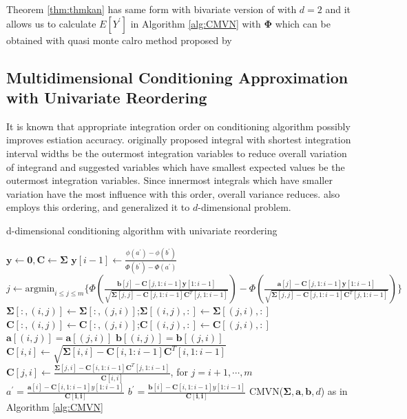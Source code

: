 Theorem \ref{thm:thmkan} has same form with bivariate version of \citet{trinh2015bivariate} with $d=2$ and it allows us to calculate $E[Y^\prime]$ in Algorithm \ref{alg:CMVN} with $\boldsymbol{\Phi}$ which can be obtained with quasi monte calro method proposed by \citet{genz2009computation}

\subsection{Multidimensional Conditioning Approximation with Univariate Reordering}
It is known that appropriate integration order on conditioning algorithm possibly improves estiation accuracy. \citet{schervish1984algorithm} originally proposed integral with shortest integration interval widths be the outermost integration variables to reduce overall variation of integrand and \citet{gibson1994monte} suggested variables which have smallest expected values be the outermost integration variables. Since innermost integrals which have smaller variation have the most influence with this order, overall variance reduces.
\citet{trinh2015bivariate} also employs this ordering, and \citet{cao2019hierarchical} generalized it to $d$-dimensional problem.
\begin{algorithm}[H]
	\caption{d-dimensional conditioning algorithm with univariate reordering}
	\begin{algorithmic}[1]
		\State $\mathbf{y}\leftarrow\mathbf{0},\mathbf{C}\leftarrow\mathbf{\Sigma}$
		\State $\mathbf{y}[i-1]\leftarrow\frac{\phi(a^\prime)-\phi(b^\prime)}{\Phi(b^\prime)-\Phi(a^\prime)}$
		\EndIf
		\State $j\leftarrow\text{argmin}_{i\leq j\leq m}\{\Phi(\frac{\mathbf{b}[j]-\mathbf{C}[j,1:i-1]\mathbf{y}[1:i-1]}{\sqrt{\mathbf{\Sigma}[j,j]-\mathbf{C}[j,1:i-1]\mathbf{C}^T[j,1:i-1]}})-\Phi(\frac{\mathbf{a}[j]-\mathbf{C}[j,1:i-1]\mathbf{y}[1:i-1]}{\sqrt{\mathbf{\Sigma}[j,j]-\mathbf{C}[j,1:i-1]\mathbf{C}^T[j,1:i-1]}})\}$
		\State $\mathbf{\Sigma}[:,(i,j)]\leftarrow\mathbf{\Sigma}[:,(j,i)]$;$\mathbf{\Sigma}[(i,j),:]\leftarrow\mathbf{\Sigma}[(j,i),:]$
		\State $\mathbf{C}[:,(i,j)]\leftarrow\mathbf{C}[:,(j,i)]$;$\mathbf{C}[(i,j),:]\leftarrow\mathbf{C}[(j,i),:]$
		\State $\mathbf{a}[(i,j)]=\mathbf{a}[(j,i)]$
		\State $\mathbf{b}[(i,j)]=\mathbf{b}[(j,i)]$
		\State $\mathbf{C}[i,i]\leftarrow\sqrt{\mathbf{\Sigma}[i,i]-\mathbf{C}[i,1:i-1]\mathbf{C}^T[i,1:i-1]}$
		\State $\mathbf{C}[j,i]\leftarrow \frac{\mathbf{\Sigma}[j,i]-\mathbf{C}[i,1:i-1]\mathbf{C}^T[j,1:i-1]}{\mathbf{C}[i,i]}$, for $j=i+1,\cdots,m$
		\State $a^\prime=\frac{\mathbf{a}[i]-\mathbf{C}[i,1:i-1]y[1:i-1]}{\mathbf{C[i,i]}}$
		\State $b^\prime=\frac{\mathbf{b}[i]-\mathbf{C}[i,1:i-1]y[1:i-1]}{\mathbf{C[i,i]}}$
		\EndFor
		\State\Return CMVN($\mathbf{\Sigma},\mathbf{a},\mathbf{b},d$) as in Algorithm \ref{alg:CMVN}
		\EndProcedure
	\end{algorithmic}\label{alg:RCMVN}
\end{algorithm}
